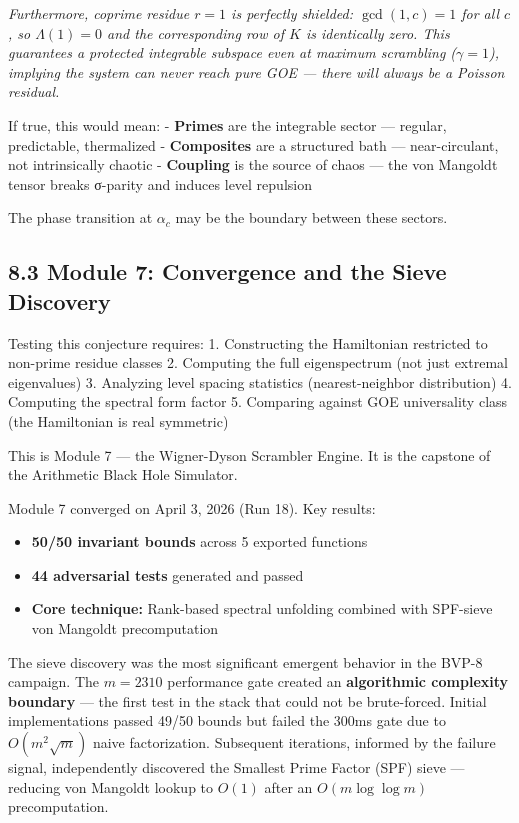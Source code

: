 \documentclass[
  11pt,
]{article}
\providecommand{\tightlist}{%
  \setlength{\itemsep}{0pt}\setlength{\parskip}{0pt}}
\numberwithin{equation}{section}
\begin{document}
\emph{Furthermore, coprime residue \(r = 1\) is perfectly shielded:
\(\gcd(1, c) = 1\) for all \(c\), so \(\Lambda(1) = 0\) and the
corresponding row of \(K\) is identically zero. This guarantees a
protected integrable subspace even at maximum scrambling
(\(\gamma = 1\)), implying the system can never reach pure GOE --- there
will always be a Poisson residual.}

If true, this would mean: - \textbf{Primes} are the integrable sector
--- regular, predictable, thermalized - \textbf{Composites} are a
structured bath --- near-circulant, not intrinsically chaotic -
\textbf{Coupling} is the source of chaos --- the von Mangoldt tensor
breaks σ-parity and induces level repulsion

The phase transition at \(\alpha_c\) may be the boundary between these
sectors.

\subsection{8.3 Module 7: Convergence and the Sieve
Discovery}\label{module-7-convergence-and-the-sieve-discovery}

Testing this conjecture requires: 1. Constructing the Hamiltonian
restricted to non-prime residue classes 2. Computing the full
eigenspectrum (not just extremal eigenvalues) 3. Analyzing level spacing
statistics (nearest-neighbor distribution) 4. Computing the spectral
form factor 5. Comparing against GOE universality class (the Hamiltonian
is real symmetric)

This is Module 7 --- the Wigner-Dyson Scrambler Engine. It is the
capstone of the Arithmetic Black Hole Simulator.

Module 7 converged on April 3, 2026 (Run 18). Key results:

\begin{itemize}
\tightlist
\item
  \textbf{50/50 invariant bounds} across 5 exported functions
\item
  \textbf{44 adversarial tests} generated and passed
\item
  \textbf{Core technique:} Rank-based spectral unfolding combined with
  SPF-sieve von Mangoldt precomputation
\end{itemize}

The sieve discovery was the most significant emergent behavior in the
BVP-8 campaign. The \(m = 2310\) performance gate created an
\textbf{algorithmic complexity boundary} --- the first test in the stack
that could not be brute-forced. Initial implementations passed 49/50
bounds but failed the 300ms gate due to \(O(m^2\sqrt{m})\) naive
factorization. Subsequent iterations, informed by the failure signal,
independently discovered the Smallest Prime Factor (SPF) sieve ---
reducing von Mangoldt lookup to \(O(1)\) after an \(O(m \log \log m)\)
precomputation.
\end{document}
